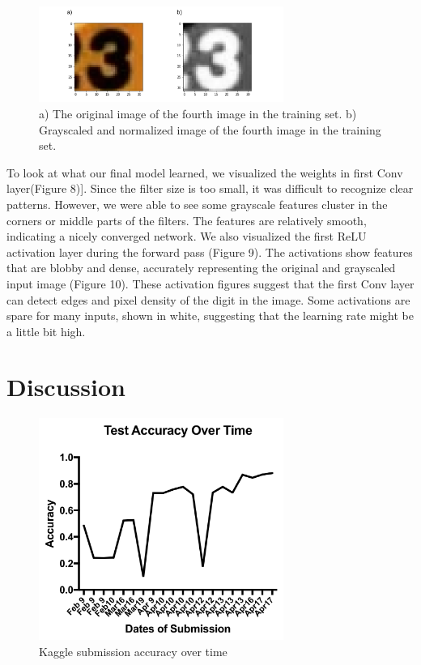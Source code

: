 \documentclass[12pt]{article}
\begin{document}
\begin{figure}[!tpb]
	\centerline{\includegraphics[width=80mm]{original.png}}
	\caption{\label{Figure 10}
		a) The original image of the fourth image in the training set. b) Grayscaled and normalized image of the fourth image in the training set.}
\end{figure}

\indent To look at what our final model learned, we visualized the weights in first Conv layer(Figure 8)]. Since the filter size is too small, it was difficult to recognize clear patterns. However, we were able to see some grayscale features cluster in the corners or middle parts of the filters. The features are relatively smooth, indicating a nicely converged network. We also visualized the first ReLU activation layer during the forward pass (Figure 9). The activations show features that are blobby and dense, accurately representing the original and grayscaled input image (Figure 10). These activation figures suggest that the first Conv layer can detect edges and pixel density of the digit in the image. Some activations are spare for many inputs, shown in white, suggesting that the learning rate might be a little bit high.

\hrulefill

\section{Discussion}

\begin{figure}[!tpb]
	\centerline{\includegraphics[width=80mm]{kagglesubmission.png}}
	\caption{\label{Figure 11}
		Kaggle submission accuracy over time}
\end{figure}
\end{document}
